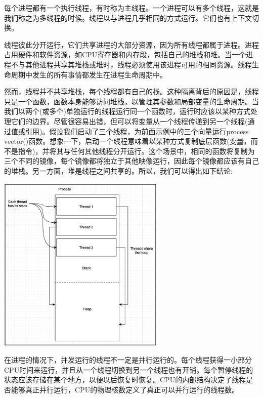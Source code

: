 每个进程都有一个执行线程，有时称为主线程。一个进程可以有多个线程，这就是我们称之为多线程的时候。线程以与进程几乎相同的方式运行。它们也有上下文切换。 \par
线程彼此分开运行，它们共享进程的大部分资源，因为所有线程都属于进程。进程占用硬件和软件资源，如CPU寄存器和内存段，包括自己的堆栈和堆。当一个进程不与其他进程共享其堆栈或堆时，线程必须使用该进程可用的相同资源。线程生命周期中发生的所有事情都发生在进程生命周期中。 \par
然而，线程并不共享堆栈，每个线程都有自己的栈。这种隔离背后的原因是，线程只是一个函数，函数本身能够访问堆栈，以管理其参数和局部变量的生命周期。当我们以两个(或多个)单独运行的线程运行同一个函数时，运行时应该以某种方式处理它们的边界。尽管很容易出错，但可以将变量从一个线程传递到另一个线程(通过值或引用)。假设我们启动了三个线程，为前面示例中的三个向量运行process\underline{ }vector()函数。想象一下，启动一个线程意味着以某种方式复制底层函数(变量，而不是指令)，并将其与任何其他线程分开运行。这个场景中，相同的函数将复制为三个不同的镜像，每个镜像都将独立于其他映像运行，因此每个镜像都应该有自己的堆栈。另一方面，堆是线程之间共享的。所以，我们可以得出如下结论: \par

\begin{center}
	\includegraphics[width=0.6\textwidth]{content/Section-2/Chapter-8/9}
\end{center}

在进程的情况下，并发运行的线程不一定是并行运行的。每个线程获得一小部分CPU时间来运行，并且从一个线程切换到另一个线程也有开销。每个暂停线程的状态应该存储在某个地方，以便以后恢复时恢复。CPU的内部结构决定了线程是否能够真正并行运行，CPU的物理核数定义了真正可以并行运行的线程数。 \par

